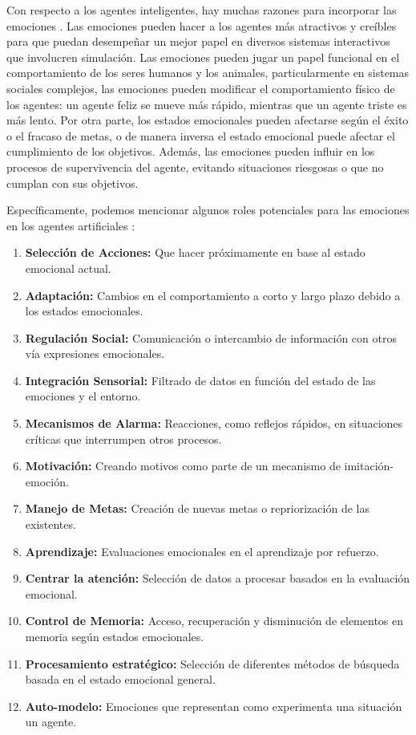 Con respecto a los agentes inteligentes, hay muchas razones para incorporar las
emociones \citep{jiang2007}. Las emociones pueden hacer a los agentes más
atractivos y creíbles para que puedan desempeñar un mejor papel en diversos
sistemas interactivos que involucren simulación. Las emociones pueden jugar un
papel funcional en el comportamiento de los seres humanos y los animales,
particularmente en sistemas sociales complejos, las emociones pueden modificar
el comportamiento físico de los agentes: un agente feliz se mueve más rápido,
mientras que un agente triste es más lento. Por otra parte, los estados
emocionales pueden afectarse según el éxito o el fracaso de metas, o de manera
inversa el estado emocional puede afectar el cumplimiento de los objetivos.
Además, las emociones pueden influir en los procesos de supervivencia del
agente, evitando situaciones riesgosas o que no cumplan con sus objetivos.

Específicamente, podemos mencionar algunos roles potenciales para las emociones
en los agentes artificiales \citep{maria2007}:

\begin{enumerate}
\item \textbf{Selección de Acciones:} Que hacer próximamente en base al estado emocional
actual.
\item \textbf{Adaptación:} Cambios en el comportamiento a corto y largo plazo debido
a los estados emocionales.
\item \textbf{Regulación Social:} Comunicación o intercambio de
información con otros vía expresiones emocionales.
\item \textbf{Integración Sensorial:} Filtrado de datos en función del estado de las
emociones y el entorno.
\item \textbf{Mecanismos de Alarma:} Reacciones, como reflejos rápidos, en situaciones críticas
que interrumpen otros procesos.
\item \textbf{Motivación:} Creando motivos como parte de un
mecanismo de imitación-emoción.
\item \textbf{Manejo de Metas:} Creación de nuevas metas o
repriorización de las existentes.
\item \textbf{Aprendizaje:} Evaluaciones emocionales en el
aprendizaje por refuerzo.
\item \textbf{Centrar la atención:} Selección de datos a procesar
basados en la evaluación emocional.
\item \textbf{Control de Memoria:} Acceso, recuperación
y disminución de elementos en memoria según estados emocionales.
\item \textbf{Procesamiento estratégico:} Selección de diferentes métodos de búsqueda basada en
el estado emocional general.
\item \textbf{Auto-modelo:} Emociones que representan como experimenta una situación un agente.
\end{enumerate}

